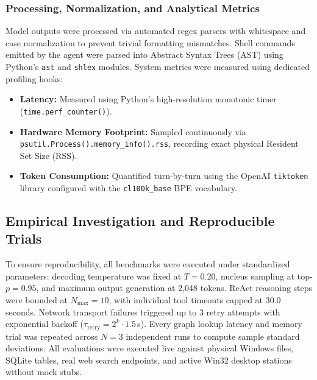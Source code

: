 \documentclass[conference,a4paper]{IEEEtran}
\begin{document}
\subsubsection{Processing, Normalization, and Analytical Metrics}
Model outputs were processed via automated regex parsers with whitespace and case normalization to prevent trivial formatting mismatches. Shell commands emitted by the agent were parsed into Abstract Syntax Trees (AST) using Python's \texttt{ast} and \texttt{shlex} modules. System metrics were measured using dedicated profiling hooks:
\begin{itemize}
    \item \textbf{Latency:} Measured using Python's high-resolution monotonic timer (\texttt{time.perf\_counter()}).
    \item \textbf{Hardware Memory Footprint:} Sampled continuously via \texttt{psutil.Process().memory\_info().rss}, recording exact physical Resident Set Size (RSS).
    \item \textbf{Token Consumption:} Quantified turn-by-turn using the OpenAI \texttt{tiktoken} library configured with the \texttt{cl100k\_base} BPE vocabulary.
\end{itemize}

\subsection{Empirical Investigation and Reproducible Trials}
To ensure reproducibility, all benchmarks were executed under standardized parameters: decoding temperature was fixed at $T = 0.20$, nucleus sampling at top-$p = 0.95$, and maximum output generation at 2,048 tokens. ReAct reasoning steps were bounded at $N_{\text{max}} = 10$, with individual tool timeouts capped at 30.0 seconds. Network transport failures triggered up to 3 retry attempts with exponential backoff ($\tau_{\text{retry}} = 2^k \cdot 1.5$\,s). Every graph lookup latency and memory trial was repeated across $N = 3$ independent runs to compute sample standard deviations. All evaluations were executed live against physical Windows files, SQLite tables, real web search endpoints, and active Win32 desktop stations without mock stubs.
\end{document}
